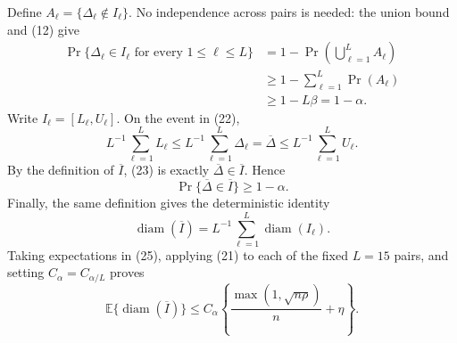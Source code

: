 Define \(A_\ell=\{\Delta_\ell\notin I_\ell\}\).  No independence across pairs is needed: the union bound and (12) give
\[
\begin{aligned}
\Pr\{\Delta_\ell\in I_\ell\text{ for every }1\leq\ell\leq L\}
&=1-\Pr\left(\bigcup_{\ell=1}^LA_\ell\right)\\
&\geq1-\sum_{\ell=1}^L\Pr(A_\ell)\\
&\geq1-L\beta
=1-\alpha.
\end{aligned}
\tag{22}
\]
Write \(I_\ell=[L_\ell,U_\ell]\).  On the event in (22),
\[
L^{-1}\sum_{\ell=1}^LL_\ell
\leq L^{-1}\sum_{\ell=1}^L\Delta_\ell
=\overline\Delta
\leq L^{-1}\sum_{\ell=1}^LU_\ell.
\tag{23}
\]
By the definition of \(\overline I\), (23) is exactly \(\overline\Delta\in\overline I\).  Hence
\[
\Pr\{\overline\Delta\in\overline I\}\geq1-\alpha.
\tag{24}
\]
Finally, the same definition gives the deterministic identity
\[
\operatorname{diam}(\overline I)
=L^{-1}\sum_{\ell=1}^L\operatorname{diam}(I_\ell).
\tag{25}
\]
Taking expectations in (25), applying (21) to each of the fixed \(L=15\) pairs, and setting \(C_\alpha=C_{\alpha/L}\) proves
\[
\mathbb E\{\operatorname{diam}(\overline I)\}
\leq C_\alpha\left\{
\frac{\max(1,\sqrt{n\rho})}{n}+\eta
\right\}.
\]
